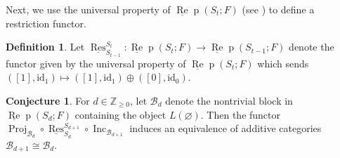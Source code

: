 \documentclass{amsart}
\newtheorem{proposition}[theorem]{Proposition}
\theoremstyle{definition}
\newtheorem{definition}[theorem]{Definition}
\newtheorem{conjecture}[theorem]{Conjecture}
\newcommand{\id}{\text{id}}
\newcommand{\Hom}{\operatorname{Hom}}
\def\uRep{\underline{\operatorname{Re}}\!\operatorname{p}}
\newcommand{\Inc}{\operatorname{Inc}}
\newcommand{\Proj}{\operatorname{Proj}}
\newcommand{\uRes}{\underline{\operatorname{Res}}}
\newcommand{\ev}{\text{ev}}
\newcommand{\coev}{\text{coev}}
\renewcommand{\1}{_{(1)}}
\renewcommand{\2}{_{(2)}}
\newcommand{\3}{_{(3)}}
\newcommand{\4}{_{(4)}}
\newcommand{\Z}{\mathbb{Z}}
\newcommand{\cat}{\mathcal}
\newcommand{\arup}[1]{\stackrel{#1}{\longrightarrow}}
\begin{document}

Next, we use the universal property of $\uRep(S_t; F)$ (see \cite[8.3]{Del07}) to define a restriction functor.

\begin{definition} Let $\uRes_{S_{t-1}}^{S_t}:\uRep(S_t; F)\to\uRep(S_{t-1}; F)$ denote the functor given by the universal property of $\uRep(S_t; F)$ which sends $([1], \id_1)\mapsto([1], \id_1)\oplus([0], \id_0)$.
\end{definition}



\begin{conjecture}\label{conjecture} For $d\in\Z_{\geq0}$, let $\cat{B}_d$ denote the nontrivial block in $\uRep(S_d; F)$ containing the object $L(\varnothing)$.  Then the functor $\Proj_{\cat{B}_d}\circ\uRes_{S_d}^{S_{d+1}}\circ\Inc_{\cat{B}_{d+1}}$ induces an equivalence of additive categories $\cat{B}_{d+1}\cong\cat{B}_{d}$.
\end{conjecture}
\end{document}
